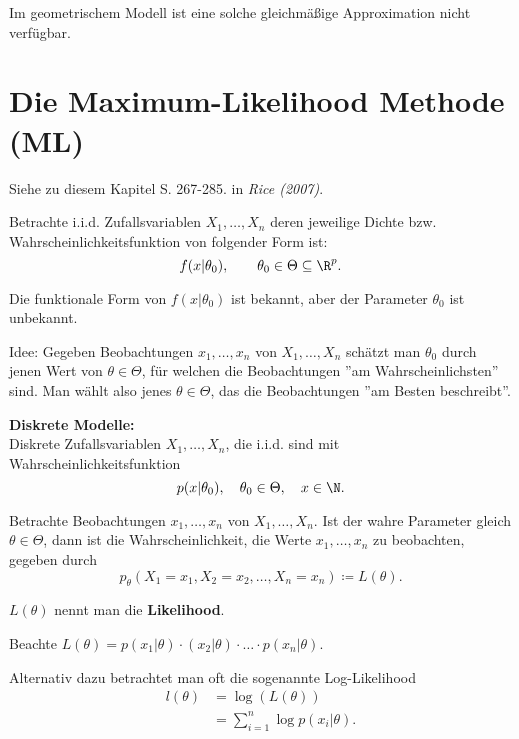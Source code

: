 \documentclass{tstextbook}
\begin{document}
Im geometrischem Modell ist eine solche gleichmäßige Approximation nicht verfügbar.


\section{Die Maximum-Likelihood Methode (ML)}

\begin{book}
	Siehe zu diesem Kapitel S. 267-285. in	\textit{Rice (2007)}.
\end{book}


Betrachte i.i.d. Zufallsvariablen $ X_1,\ldots,X_n $ deren jeweilige Dichte bzw. Wahrscheinlichkeitsfunktion von folgender Form ist: 
\[
f(x|\theta_0), \qquad \theta_0 \in \Theta \subseteq \R^p.
\]

Die funktionale Form von $ f(x|\theta_0) $ ist bekannt, aber der Parameter $ \theta_0 $ ist unbekannt. 

\begin{remark}
	Idee: Gegeben Beobachtungen $ x_1,\ldots,x_n $ von $ X_1,\ldots,X_n $ schätzt man $ \theta_0 $ durch jenen Wert von $ \theta\in\Theta $, für welchen die Beobachtungen ''am Wahrscheinlichsten'' sind. Man wählt also jenes $ \theta\in\Theta $, das die Beobachtungen ''am Besten beschreibt''. 
\end{remark}

	
\textbf{Diskrete Modelle:} \\

Diskrete Zufallsvariablen $ X_1,\ldots,X_n $, die i.i.d. sind mit Wahrscheinlichkeitsfunktion 
\[
p(x|\theta_0), \quad \theta_0\in\Theta, \quad x\in\N.
\]

Betrachte Beobachtungen $ x_1,\ldots,x_n $ von $ X_1,\ldots,X_n $. Ist der wahre Parameter gleich $ \theta\in\Theta $, dann ist die Wahrscheinlichkeit, die Werte $ x_1,\ldots,x_n $ zu beobachten, gegeben durch 
\[
p_\theta \left(X_1=x_1,X_2=x_2,\ldots,X_n=x_n\right) \coloneqq L(\theta).
\]

$ L(\theta) $ nennt man die \textbf{Likelihood}. 

Beachte $ L(\theta) = p(x_1|\theta)\cdotp(x_2|\theta)\cdot\ldots\cdot p(x_n|\theta) $.

Alternativ dazu betrachtet man oft die sogenannte Log-Likelihood
\[\begin{aligned}
	l(\theta) & = \log(L(\theta)) \\
	& = \sum_{i=1}^{n}\log p(x_i|\theta).
\end{aligned}
\]
\end{document}
